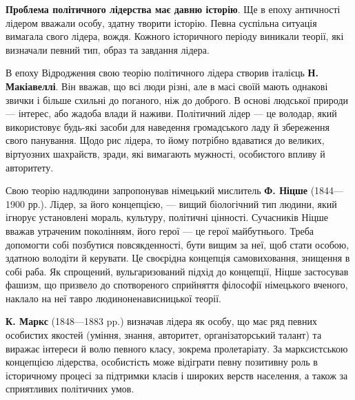 \textbf{Проблема політичного лідерства має давню історію}. Ще в епоху античності лідером вважали особу, здатну творити історію. Певна суспільна ситуація вимагала свого лідера, вождя. Кожного історичного періоду виникали теорії, які визначали певний тип, образ та завдання лідера.

В епоху Відродження свою теорію політичного лідера створив італієць \textbf{Н. Макіавеллі}. Він вважав, що всі люди різні, але в масі своїй мають однакові звички і більше схильні до поганого, ніж до доброго. В основі людської природи — інтерес, або жадоба влади й наживи. Політичний лідер — це володар, який використовує будь-які засоби для наведення громадського ладу й збереження свого панування. Щодо рис лідера, то йому потрібно вдаватися до великих, віртуозних шахрайств, зради, які вимагають мужності, особистого впливу й авторитету.

Свою теорію надлюдини запропонував німецький мислитель \textbf{Ф. Ніцше} (1844—1900 рр.). Лідер, за його концепцією, — вищий біологічний тип людини, який ігнорує установлені мораль, культуру, політичні цінності. Сучасників Ніцше вважав утраченим поколінням, його герої — це герої майбутнього. Треба допомогти собі позбутися повсякденності, бути вищим за неї, щоб стати особою, здатною володіти й керувати. Це своєрідна концепція самовиховання, знищення в собі раба. Як спрощений, вульгаризований підхід до концепції, Ніцше застосував фашизм, що призвело до спотвореного сприйняття філософії німецького вченого, наклало на неї тавро людиноненависницької теорії.

\textbf{К. Маркс} (1848—1883 pp.) визначав лідера як особу, що має ряд певних особистих якостей (уміння, знання, авторитет, організаторський талант) та виражає інтереси й волю певного класу, зокрема пролетаріату. За марксистською концепцією лідерства, особистість може відіграти певну позитивну роль в історичному процесі за підтримки класів і широких верств населення, а також за сприятливих політичних умов.
